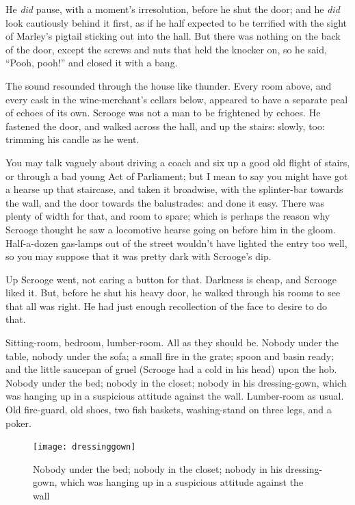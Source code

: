 \documentclass[paper=a5,BCOR=15mm,twoside,DIV=15,headinclude=off,12pt,chapterprefix=off,openany,headings=huge]{scrbook} %
\begin{document}
He \textit{did} pause, with a moment's irresolution, before he shut the door; and he \textit{did} look cautiously behind it first, as if he half expected to be terrified with the sight of Marley's pigtail sticking out into the hall. But there was nothing on the back of the door, except the screws and nuts that held the knocker on, so he said, \enquote{Pooh, pooh!} and closed it with a bang.

The sound resounded through the house like thunder. Every room above, and every cask in the wine-merchant's cellars below, appeared to have a separate peal of echoes of its own. Scrooge was not a man to be frightened by echoes. He fastened the door, and walked across the hall, and up the stairs: slowly, too: trimming his candle as he went.

You may talk vaguely about driving a coach and six up a good old flight of stairs, or through a bad young Act of Parliament; but I mean to say you might have got a hearse up that staircase, and taken it broadwise, with the splinter-bar towards the wall, and the door towards the balustrades: and done it easy. There was plenty of width for that, and room to spare; which is perhaps the reason why Scrooge thought he saw a locomotive hearse going on before him in the gloom. Half-a-dozen gas-lamps out of the street wouldn't have lighted the entry too well, so you may suppose that it was pretty dark with Scrooge's dip.

Up Scrooge went, not caring a button for that. Darkness is cheap, and Scrooge liked it. But, before he shut his heavy door, he walked through his rooms to see that all was right. He had just enough recollection of the face to desire to do that.

Sitting-room, bedroom, lumber-room. All as they should be. Nobody under the table, nobody under the sofa; a small fire in the grate; spoon and basin ready; and the little saucepan of gruel (Scrooge had a cold in his head) upon the hob. Nobody under the bed; nobody in the closet; nobody in his dressing-gown, which was hanging up in a suspicious attitude against the wall. Lumber-room as usual. Old fire-guard, old shoes, two fish baskets, washing-stand on three legs, and a poker.

\begin{figure}[p]
\begin{minipage}[c]{\linewidth}
\texttt{[image: dressinggown]}
\caption*{Nobody under the bed; nobody in the closet; nobody in his dressing-gown, which was hanging up in a suspicious attitude against the wall}
\end{minipage}
\end{figure}
 
\end{document}
